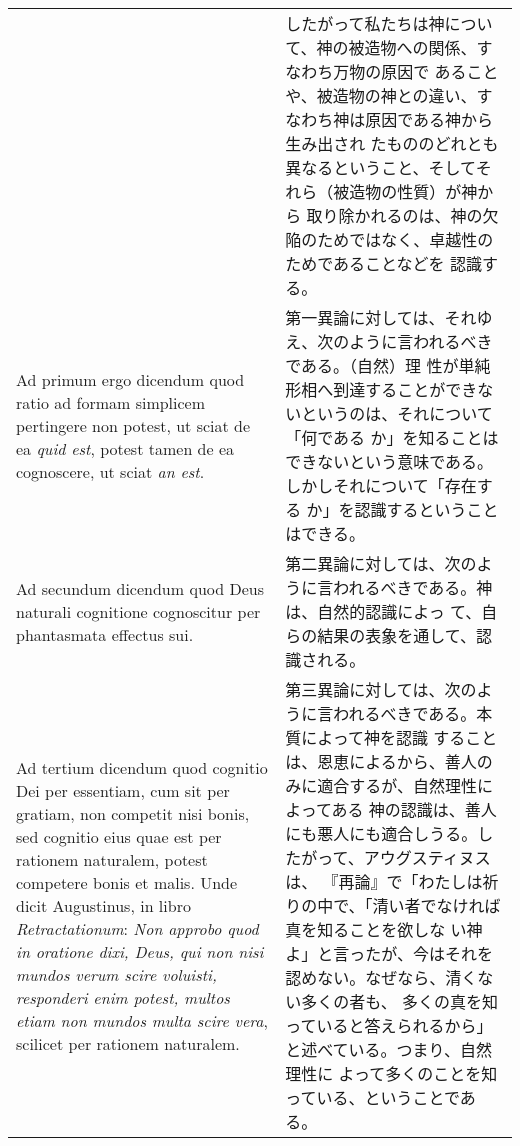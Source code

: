 \documentclass[10pt]{jsarticle} %
\begin{document}
\begin{longtable}{p{21em}p{21em}}
&

したがって私たちは神について、神の被造物への関係、すなわち万物の原因で
あることや、被造物の神との違い、すなわち神は原因である神から生み出され
たもののどれとも異なるということ、そしてそれら（被造物の性質）が神から
取り除かれるのは、神の欠陥のためではなく、卓越性のためであることなどを
認識する。

\\

{\sc Ad primum ergo dicendum} quod ratio ad formam simplicem
pertingere non potest, ut sciat de ea {\it quid est}, potest tamen de
ea cognoscere, ut sciat {\it an est}.

&

第一異論に対しては、それゆえ、次のように言われるべきである。（自然）理
性が単純形相へ到達することができないというのは、それについて「何である
か」を知ることはできないという意味である。しかしそれについて「存在する
か」を認識するということはできる。

\\

{\sc Ad secundum dicendum} quod Deus naturali cognitione cognoscitur
per phantasmata effectus sui.

&

第二異論に対しては、次のように言われるべきである。神は、自然的認識によっ
て、自らの結果の表象を通して、認識される。

\\

{\sc Ad tertium dicendum} quod cognitio Dei per essentiam, cum sit per
gratiam, non competit nisi bonis, sed cognitio eius quae est per
rationem naturalem, potest competere bonis et malis. Unde dicit
Augustinus, in libro {\it Retractationum}: {\it Non approbo quod in
oratione dixi, Deus, qui non nisi mundos verum scire voluisti,
responderi enim potest, multos etiam non mundos multa scire vera},
scilicet per rationem naturalem.

&

第三異論に対しては、次のように言われるべきである。本質によって神を認識
することは、恩恵によるから、善人のみに適合するが、自然理性によってある
神の認識は、善人にも悪人にも適合しうる。したがって、アウグスティヌスは、
『再論』で「わたしは祈りの中で、「清い者でなければ真を知ることを欲しな
い神よ」と言ったが、今はそれを認めない。なぜなら、清くない多くの者も、
多くの真を知っていると答えられるから」と述べている。つまり、自然理性に
よって多くのことを知っている、ということである。

\end{longtable}
\end{document}
